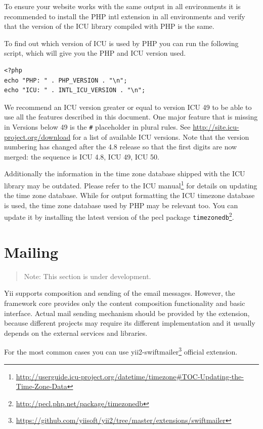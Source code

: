 To ensure your website works with the same output in all environments it is recommended to install the PHP intl extension
in all environments and verify that the version of the ICU library compiled with PHP is the same.

To find out which version of ICU is used by PHP you can run the following script, which will give you the PHP and ICU version used.

\begin{lstlisting}
<?php
echo "PHP: " . PHP_VERSION . "\n";
echo "ICU: " . INTL_ICU_VERSION . "\n";
\end{lstlisting}
We recommend an ICU version greater or equal to version ICU 49 to be able to use all the features described in this document.
One major feature that is missing in Versions below 49 is the \lstinline|#| placeholder in plural rules.
See \url{http://site.icu-project.org/download} for a list of available ICU versions. Note that the version numbering has changed after the
4.8 release so that the first digits are now merged: the sequence is ICU 4.8, ICU 49, ICU 50.

Additionally the information in the time zone database shipped with the ICU library may be outdated. Please refer
to the ICU manual\footnote{\url{http://userguide.icu-project.org/datetime/timezone\#TOC-Updating-the-Time-Zone-Data}} for details
on updating the time zone database. While for output formatting the ICU timezone database is used, the time zone database
used by PHP may be relevant too. You can update it by installing the latest version of the pecl package \lstinline|timezonedb|\footnote{\url{http://pecl.php.net/package/timezonedb}}.



\label{tutorial-mailing.md}\section{Mailing}
\begin{quote}Note: This section is under development.

\end{quote}
Yii supports composition and sending of the email messages. However, the framework core provides
only the content composition functionality and basic interface. Actual mail sending mechanism should
be provided by the extension, because different projects may require its different implementation and
it usually depends on the external services and libraries.

For the most common cases you can use yii2-swiftmailer\footnote{\url{https://github.com/yiisoft/yii2/tree/master/extensions/swiftmailer}} official extension.

